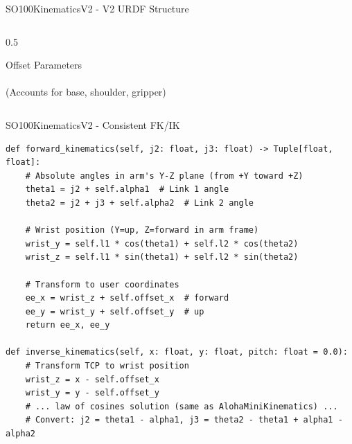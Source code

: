 \begin{frame}{SO100KinematicsV2 - V2 URDF Structure}
\begin{columns}
\begin{column}{0.5\textwidth}

    \vspace{0.4cm}

    \begin{block}{Offset Parameters}
    \\
    \\
    (Accounts for base, shoulder, gripper)
    \end{block}
\end{column}
\end{columns}
\end{frame}

\begin{frame}[fragile]{SO100KinematicsV2 - Consistent FK/IK}
\begin{lstlisting}
def forward_kinematics(self, j2: float, j3: float) -> Tuple[float, float]:
    # Absolute angles in arm's Y-Z plane (from +Y toward +Z)
    theta1 = j2 + self.alpha1  # Link 1 angle
    theta2 = j2 + j3 + self.alpha2  # Link 2 angle

    # Wrist position (Y=up, Z=forward in arm frame)
    wrist_y = self.l1 * cos(theta1) + self.l2 * cos(theta2)
    wrist_z = self.l1 * sin(theta1) + self.l2 * sin(theta2)

    # Transform to user coordinates
    ee_x = wrist_z + self.offset_x  # forward
    ee_y = wrist_y + self.offset_y  # up
    return ee_x, ee_y

def inverse_kinematics(self, x: float, y: float, pitch: float = 0.0):
    # Transform TCP to wrist position
    wrist_z = x - self.offset_x
    wrist_y = y - self.offset_y
    # ... law of cosines solution (same as AlohaMiniKinematics) ...
    # Convert: j2 = theta1 - alpha1, j3 = theta2 - theta1 + alpha1 - alpha2
\end{lstlisting}
\end{frame}

